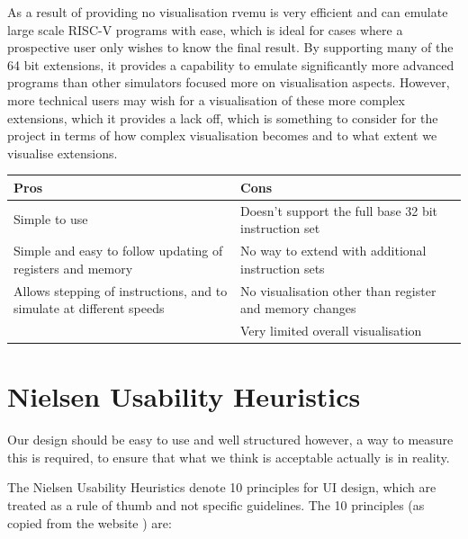 As a result of providing no visualisation rvemu is very efficient and can emulate large scale RISC-V programs with ease, which is ideal for cases where a prospective user only wishes to know the final result. By supporting many of the 64 bit extensions, it provides a capability to emulate significantly more advanced programs than other simulators focused more on visualisation aspects. However, more technical users may wish for a visualisation of these more complex extensions, which it provides a lack off, which is something to consider for the project in terms of how complex visualisation becomes and to what extent we visualise extensions.

\begin{table}[H]
\begin{tabular}{|p{0.5\linewidth} | p{0.5\linewidth}|}
\hline
\textbf{Pros}                                                        & \textbf{Cons}                                           \\ \hline
Simple to use                                                        & Doesn't support the full base 32 bit instruction set    \\ \hline
Simple and easy to follow updating of registers and memory           & No way to extend with additional instruction sets       \\ \hline
Allows stepping of instructions, and to simulate at different speeds & No visualisation other than register and memory changes \\ \hline
                                                                     & Very limited overall visualisation                      \\ \hline
\end{tabular}
\end{table}

\section{Nielsen Usability Heuristics}\label{sec:nielson}
Our design should be easy to use and well structured however, a way to measure this is required, to ensure that what we think is acceptable actually is in reality.

The Nielsen Usability Heuristics \cite{nielsen_2020_10} denote 10 principles for \ac{UI} design, which are treated as a rule of thumb and not specific guidelines. The 10 principles (as copied from the website \cite{nielsen_2020_10}) are:

